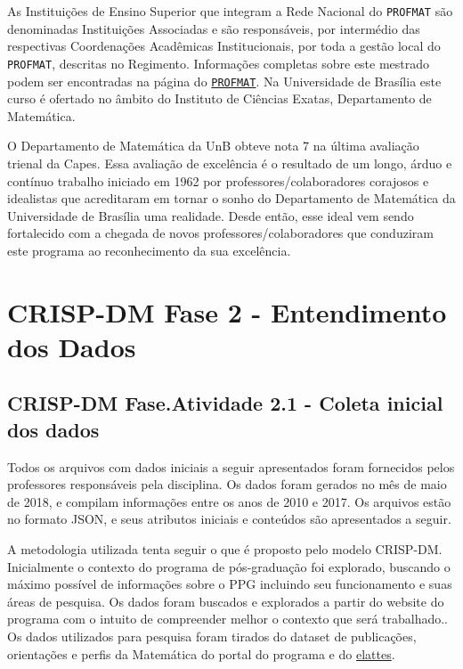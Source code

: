 \documentclass[]{article}
\begin{document}
As Instituições de Ensino Superior que integram a Rede Nacional do
\texttt{PROFMAT} são denominadas Instituições Associadas e são
responsáveis, por intermédio das respectivas Coordenações Acadêmicas
Institucionais, por toda a gestão local do \texttt{PROFMAT}, descritas
no Regimento. Informações completas sobre este mestrado podem ser
encontradas na página do
\href{http://www.profmat-sbm.org.br}{\texttt{PROFMAT}}. Na Universidade
de Brasília este curso é ofertado no âmbito do Instituto de Ciências
Exatas, Departamento de Matemática.

O Departamento de Matemática da UnB obteve nota 7 na última avaliação
trienal da Capes. Essa avaliação de excelência é o resultado de um
longo, árduo e contínuo trabalho iniciado em 1962 por
professores/colaboradores corajosos e idealistas que acreditaram em
tornar o sonho do Departamento de Matemática da Universidade de Brasília
uma realidade. Desde então, esse ideal vem sendo fortalecido com a
chegada de novos professores/colaboradores que conduziram este programa
ao reconhecimento da sua excelência.

\section{CRISP-DM Fase 2 - Entendimento dos
Dados}\label{crisp-dm-fase-2---entendimento-dos-dados}

\subsection{CRISP-DM Fase.Atividade 2.1 - Coleta inicial dos
dados}\label{crisp-dm-fase.atividade-2.1---coleta-inicial-dos-dados}

Todos os arquivos com dados iniciais a seguir apresentados foram
fornecidos pelos professores responsáveis pela disciplina. Os dados
foram gerados no mês de maio de 2018, e compilam informações entre os
anos de 2010 e 2017. Os arquivos estão no formato JSON, e seus atributos
iniciais e conteúdos são apresentados a seguir.

A metodologia utilizada tenta seguir o que é proposto pelo modelo
CRISP-DM. Inicialmente o contexto do programa de pós-graduação foi
explorado, buscando o máximo possível de informações sobre o PPG
incluindo seu funcionamento e suas áreas de pesquisa. Os dados foram
buscados e explorados a partir do website do programa com o intuito de
compreender melhor o contexto que será trabalhado.. Os dados utilizados
para pesquisa foram tirados do dataset de publicações, orientações e
perfis da Matemática do portal do programa e do
\href{http://unb.elattes.com.br/user/login}{elattes}.
\end{document}
